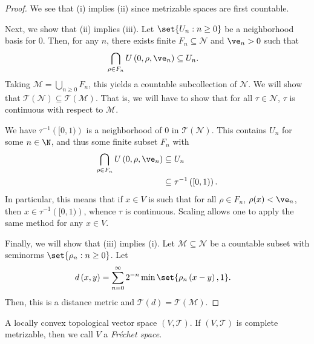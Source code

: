 \documentclass[10pt]{mypackage}
\begin{document}
\begin{proof}
  We see that (i) implies (ii) since metrizable spaces are first countable.

  Next, we show that (ii) implies (iii). Let $\set{U_n : n\geq 0}$ be a neighborhood basis for $0$. Then, for any $n$, there exists finite $F_n\subseteq \mathcal{N}$ and $\ve_n > 0$ such that
  \begin{align*}
    \bigcap_{\rho\in F_n} U\left( 0,\rho,\ve_n \right) &\subseteq U_n.
  \end{align*}
  Taking $\mathcal{M} = \bigcup_{n\geq 0} F_n$, this yields a countable subcollection of $ \mathcal{N} $. We will show that $ \mathcal{T}\left( \mathcal{N} \right)\subseteq \mathcal{T}\left( \mathcal{M} \right) $. That is, we will have to show that for all $\tau\in \mathcal{N}$, $\tau$ is continuous with respect to $ \mathcal{M} $.

  We have $\tau^{-1}\left( [0,1) \right)$ is a neighborhood of $0$ in $ \mathcal{T}\left( \mathcal{N} \right) $. This contains $ U_n $ for some $n\in \N$, and thus some finite subset $F_n$ with
  \begin{align*}
    \bigcap_{\rho\in F_n} U\left( 0,\rho,\ve_n \right) &\subseteq U_n\\
                                                       &\subseteq \tau^{-1}\left( [0,1) \right).
  \end{align*}
  In particular, this means that if $x\in V$ is such that for all $\rho\in F_n$, $\rho(x) < \ve_n$, then $x\in \tau^{-1}\left( [0,1) \right)$, whence $\tau$ is continuous. Scaling allows one to apply the same method for any $x\in V$.

  Finally, we will show that (iii) implies (i). Let $\mathcal{M}\subseteq \mathcal{N}$ be a countable subset with seminorms $\set{\rho_n : n\geq 0}$. Let
  \begin{align*}
    d\left( x,y \right) &= \sum_{n=0}^{\infty} 2^{-n}\min\set{\rho_n\left( x-y \right),1}.
  \end{align*}
  Then, this is a distance metric and $ \mathcal{T}\left( d \right) = \mathcal{T}\left( \mathcal{M} \right) $.
\end{proof}
\begin{definition}
  A locally convex topological vector space $\left( V,\mathcal{T} \right)$. If $\left( V,\mathcal{T} \right)$ is complete metrizable, then we call $V$ a \textit{Fréchet space}.
\end{definition}
\end{document}
